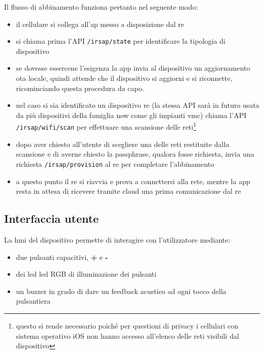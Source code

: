 \documentclass[12pt,a4paper,twoside,titlepage]{book}
\begin{document}
Il flusso di abbinamento funziona pertanto nel seguente modo:
\begin{itemize}
    \item il cellulare si collega all'\acrshort{ap} messo a disposizione dal \acrshort{re}
    \item si chiama prima l'API \texttt{/irsap/state} per identificare la tipologia di dispositivo
    \item se dovesse essercene l'esigenza la app invia al dispositivo un aggiornamento \acrshort{ota} locale, 
        quindi attende che il dispositivo si aggiorni e si riconnette, ricominciando questa procedura da capo.
    \item nel caso si sia identificato un dispositivo \acrshort{re} (la stessa API sarà in futuro 
        usata da più dispositivi della famiglia \Gls{now} come gli impianti \acrshort{vmc}) chiama 
        l'API \texttt{/irsap/wifi/scan} per effettuare una scansione delle reti\footnote{questo si rende
        necessario poiché per questioni di privacy i cellulari con sistema operativo iOS non hanno accesso all'elenco 
        delle reti visibili dal dispositivo}
    \item dopo aver chiesto all'utente di scegliere una delle reti restituite dalla scansione e di 
        averne chiesto la passphrase, qualora fosse richiesta, invia una richiesta \texttt{/irsap/provision}
        al \acrshort{re} per completare l'abbinamento 
    \item a questo punto il \acrshort{re} si riavvia e prova a connettersi alla rete, mentre la app resta 
        in attesa di ricevere tramite \gls{cloud} una prima comunicazione dal \acrshort{re}
\end{itemize}

\subsection{Interfaccia utente}

La \acrfull{hmi} del dispositivo permette di interagire con l'utilizzatore mediante:
\begin{itemize}
    \item due pulsanti capacitivi, \textbf{+} e \textbf{-}
    \item dei led \acrshort{led} RGB di illuminazione dei pulsanti 
    \item un buzzer in grado di dare un feedback acustico ad ogni tocco della pulsantiera
\end{itemize}
\end{document}
